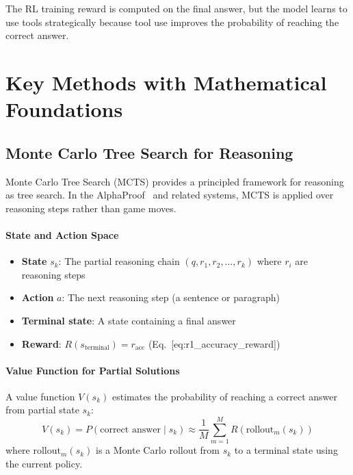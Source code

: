 The RL training reward is computed on the final answer, but the model learns to use tools strategically because tool use improves the probability of reaching the correct answer.

\section{Key Methods with Mathematical Foundations}
\label{subsec:reasoning_methods}

\subsection{Monte Carlo Tree Search for Reasoning}
\label{subsubsec:mcts_reasoning}

Monte Carlo Tree Search (MCTS) provides a principled framework for reasoning as tree search. In the AlphaProof~\cite{alphaproof2024} and related systems, MCTS is applied over reasoning steps rather than game moves.

\paragraph{State and Action Space}
\label{state-and-action-space}

\begin{itemize}
  \item \textbf{State} $s_k$: The partial reasoning chain $(q, r_1, r_2, \ldots, r_k)$ where $r_i$ are reasoning steps
  \item \textbf{Action} $a$: The next reasoning step (a sentence or paragraph)
  \item \textbf{Terminal state}: A state containing a final answer
  \item \textbf{Reward}: $R(s_{\text{terminal}}) = r_{\text{acc}}$ (Eq.~[eq:r1\_accuracy\_reward])
\end{itemize}

\paragraph{Value Function for Partial Solutions}
\label{value-function-for-partial-solutions}

A value function $V(s_k)$ estimates the probability of reaching a correct answer from partial state $s_k$: 
\begin{equation}
    V(s_k) = P(\text{correct answer} \mid s_k) \approx \frac{1}{M} \sum_{m=1}^{M} R(\text{rollout}_m(s_k))
\end{equation}
 where $\text{rollout}_m(s_k)$ is a Monte Carlo rollout from $s_k$ to a terminal state using the current policy.

